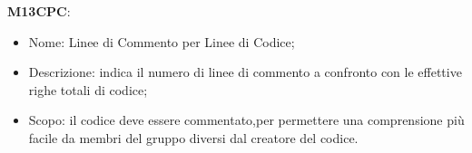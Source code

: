     \textbf{M13CPC}:
    \begin{itemize}
      \item Nome: Linee di Commento per Linee di Codice;
      \item Descrizione: indica il numero di linee di commento a confronto con le effettive righe totali di codice;
      \item Scopo: il codice deve essere commentato,per permettere una comprensione più facile da membri del gruppo diversi dal creatore del codice.
    \end{itemize}

			